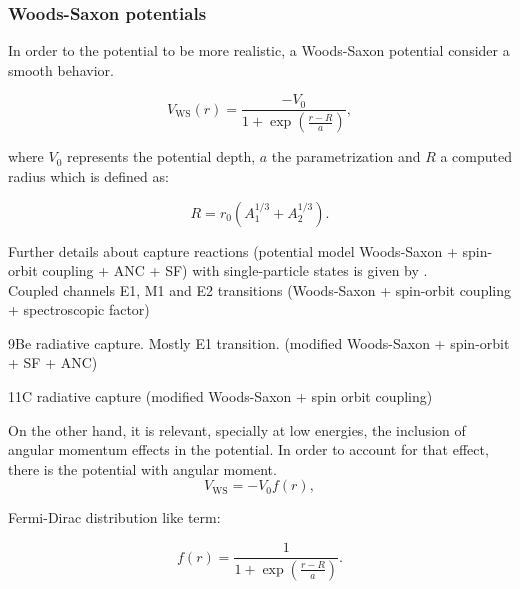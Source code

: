 \documentclass[openany]{book}
\begin{document}
\subsubsection{Woods-Saxon potentials} \label{sub:potential_effective_woodsSaxon}

In order to the potential to be more realistic, a Woods-Saxon potential consider a smooth behavior.

\begin{equation} \label{eq:potential_WoodsSaxon}
	V_{\mathrm{WS}}(r) = \frac{-V_0}{1 + \exp  \left({\frac{r-R}{a}}\right)},
\end{equation}

where $V_0$ represents the potential depth, $a$ the parametrization and $R$ a computed radius which is defined as: 

\begin{equation} \label{eq:potential_WoodsSaxon_radius}
	R = r_0(A_1^{1/3} + A_2^{1/3}).
\end{equation}

Further details about capture reactions (potential model Woods-Saxon + spin-orbit coupling + ANC + SF) with single-particle states is given by \cite{huang_bertulani_guimaraes_2010}. \\

Coupled channels  E1, M1 and E2 transitions (Woods-Saxon + spin-orbit coupling + spectroscopic factor) \cite{bertulani_1996}

9Be radiative capture. Mostly E1 transition.  (modified Woods-Saxon + spin-orbit + SF + ANC) \cite{kabir_nabi_2021}

11C radiative capture (modified Woods-Saxon + spin orbit coupling)\cite{kabir_irgaziev_nabi_sagheer_2022}

On the other hand, it is relevant, specially at low energies, the inclusion of angular momentum effects in the potential. In order to account for that effect, there is the potential with angular moment. \\

\begin{equation} \label{eq:potential_WoodsSaxon2}
	V_{\mathrm{WS}} = -V_0 f(r),
\end{equation}

Fermi-Dirac distribution like term: 

\begin{equation}  \label{eq:potential_WoodsSaxon2_fermiDirac}
	f(r) = \frac{1}{1 + \exp {\left(\frac{r- R}{a}\right)}}.
\end{equation}
\end{document}
